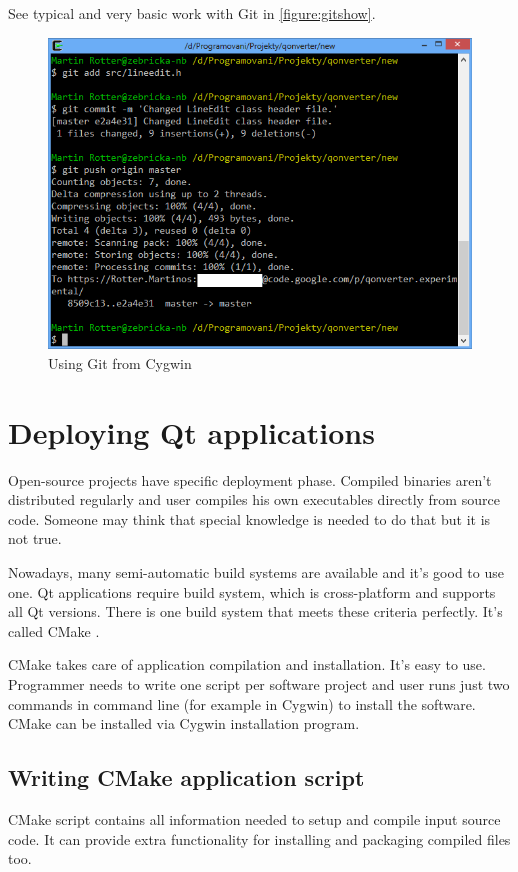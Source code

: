 See typical and very basic work with Git in \autoref{figure:gitshow}.

\begin{figure}[ht]
\begin{center}
\includegraphics[width=12cm]{graphics/real-world/05-gitshow.png}
\caption{Using Git from Cygwin}\label{figure:gitshow}
\end{center}
\end{figure}

\section{Deploying Qt applications}
Open-source projects have specific deployment phase. Compiled binaries aren't distributed regularly and user compiles his own executables directly from source code. Someone may think that special knowledge is needed to do that but it is not true.

Nowadays, many semi-automatic build systems are available and it's good to use one. Qt applications require build system, which is cross-platform and supports all Qt versions. There is one build system that meets these criteria perfectly. It's called CMake \citep{various:cmake}.

CMake takes care of application compilation and installation. It's easy to use. Programmer needs to write one script per software project and user runs just two commands in command line (for example in Cygwin) to install the software. CMake can be installed via Cygwin installation program.

\subsection{Writing CMake application script}
CMake script contains all information needed to setup and compile input source code. It can provide extra functionality for installing and packaging compiled files too.

